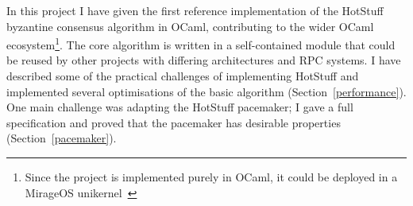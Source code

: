 




In this project I have given the first reference implementation of the HotStuff byzantine consensus algorithm in OCaml, contributing to the wider OCaml ecosystem\footnote{Since the project is implemented purely in OCaml, it could be deployed in a MirageOS unikernel~\cite{mirage}}. The core algorithm is written in a self-contained module that could be reused by other projects with differing architectures and RPC systems. I have described some of the practical challenges of implementing HotStuff and implemented several optimisations of the basic algorithm (Section~\ref{performance}). One main challenge was adapting the HotStuff pacemaker; I gave a full specification and proved that the pacemaker has desirable properties (Section~\ref{pacemaker}).

